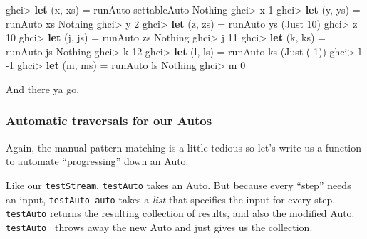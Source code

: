 \documentclass[]{article}
\newenvironment{Shaded}{}{}
\newcommand{\KeywordTok}[1]{\textcolor[rgb]{0.00,0.44,0.13}{\textbf{{#1}}}}
\newcommand{\DataTypeTok}[1]{\textcolor[rgb]{0.56,0.13,0.00}{{#1}}}
\newcommand{\DecValTok}[1]{\textcolor[rgb]{0.25,0.63,0.44}{{#1}}}
\newcommand{\FunctionTok}[1]{\textcolor[rgb]{0.02,0.16,0.49}{{#1}}}
\newcommand{\NormalTok}[1]{{#1}}
\begin{document}
\begin{Shaded}
\begin{Highlighting}[]
\NormalTok{ghci}\FunctionTok{>} \KeywordTok{let} \NormalTok{(x, xs) }\FunctionTok{=} \NormalTok{runAuto settableAuto }\DataTypeTok{Nothing}
\NormalTok{ghci}\FunctionTok{>} \NormalTok{x}
\DecValTok{1}
\NormalTok{ghci}\FunctionTok{>} \KeywordTok{let} \NormalTok{(y, ys) }\FunctionTok{=} \NormalTok{runAuto xs }\DataTypeTok{Nothing}
\NormalTok{ghci}\FunctionTok{>} \NormalTok{y}
\DecValTok{2}
\NormalTok{ghci}\FunctionTok{>} \KeywordTok{let} \NormalTok{(z, zs) }\FunctionTok{=} \NormalTok{runAuto ys (}\DataTypeTok{Just} \DecValTok{10}\NormalTok{)}
\NormalTok{ghci}\FunctionTok{>} \NormalTok{z}
\DecValTok{10}
\NormalTok{ghci}\FunctionTok{>} \KeywordTok{let} \NormalTok{(j, js) }\FunctionTok{=} \NormalTok{runAuto zs }\DataTypeTok{Nothing}
\NormalTok{ghci}\FunctionTok{>} \NormalTok{j}
\DecValTok{11}
\NormalTok{ghci}\FunctionTok{>} \KeywordTok{let} \NormalTok{(k, ks) }\FunctionTok{=} \NormalTok{runAuto js }\DataTypeTok{Nothing}
\NormalTok{ghci}\FunctionTok{>} \NormalTok{k}
\DecValTok{12}
\NormalTok{ghci}\FunctionTok{>} \KeywordTok{let} \NormalTok{(l, ls) }\FunctionTok{=} \NormalTok{runAuto ks (}\DataTypeTok{Just} \NormalTok{(}\FunctionTok{-}\DecValTok{1}\NormalTok{))}
\NormalTok{ghci}\FunctionTok{>} \NormalTok{l}
\FunctionTok{-}\DecValTok{1}
\NormalTok{ghci}\FunctionTok{>} \KeywordTok{let} \NormalTok{(m, ms) }\FunctionTok{=} \NormalTok{runAuto ls }\DataTypeTok{Nothing}
\NormalTok{ghci}\FunctionTok{>} \NormalTok{m}
\DecValTok{0}
\end{Highlighting}
\end{Shaded}

And there ya go.

\subsubsection{Automatic traversals for our
Autos}\label{automatic-traversals-for-our-autos}

Again, the manual pattern matching is a little tedious so let's write us a
function to automate ``progressing'' down an Auto.

Like our \texttt{testStream}, \texttt{testAuto} takes an Auto. But because every
``step'' needs an input, \texttt{testAuto\ auto} takes a \emph{list} that
specifies the input for every step. \texttt{testAuto} returns the resulting
collection of results, and also the modified Auto. \texttt{testAuto\_} throws
away the new Auto and just gives us the collection.
\end{document}
